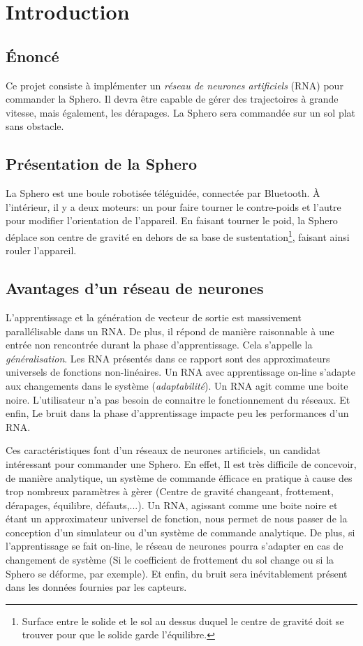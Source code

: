 \section{Introduction}
\subsection{Énoncé}
Ce projet consiste à implémenter un \emph{réseau de neurones artificiels} \hypertarget{rna}{(RNA)} pour commander la Sphero.
Il devra être capable de gérer des trajectoires à grande vitesse, mais également, les dérapages.
La Sphero sera commandée sur un sol plat sans obstacle.
\subsection{Présentation de la Sphero}
La Sphero est une boule robotisée téléguidée, connectée par Bluetooth.
À l'intérieur, il y a deux moteurs: un pour faire tourner le contre-poids et l'autre pour modifier l'orientation de l'appareil.
En faisant tourner le poid, la Sphero déplace son centre de gravité en dehors de sa base de sustentation\footnote{Surface entre le solide et le sol au dessus duquel le centre de gravité doit se trouver pour que le solide garde l'équilibre.}, faisant ainsi rouler l'appareil.
\subsection{Avantages d'un réseau de neurones}

L'apprentissage et la génération de vecteur de sortie est massivement parallélisable dans un RNA.\cite{corelet,Haykin}
De plus, il répond de manière raisonnable à une entrée non rencontrée durant la phase d'apprentissage. Cela s'appelle la \emph{généralisation}.\cite{statistica,Haykin}
Les RNA présentés dans ce rapport sont des approximateurs universels de fonctions non-linéaires.\cite{Haykin}
Un RNA avec apprentissage on-line s'adapte aux changements dans le système (\emph{adaptabilité}).\cite{Haykin}
Un RNA agit comme une boite noire. L'utilisateur n'a pas besoin de connaitre le fonctionnement du réseaux.
Et enfin, Le bruit dans la phase d'apprentissage impacte peu les performances d'un RNA.\cite{Haykin}

Ces caractéristiques font d'un réseaux de neurones artificiels, un candidat intéressant pour commander une Sphero. 
En effet, Il est très difficile de concevoir, de manière analytique, un système de commande éfficace en pratique à cause des trop nombreux paramètres à gèrer (Centre de gravité changeant, frottement, dérapages, équilibre, défauts,...).
Un RNA, agissant comme une boite noire et étant un approximateur universel de fonction, nous permet de nous passer de la conception d'un simulateur ou d'un système de commande analytique.
De plus, si l'apprentissage se fait on-line, le réseau de neurones pourra s'adapter en cas de changement de système (Si le coefficient de frottement du sol change ou si la Sphero se déforme, par exemple).
Et enfin, du bruit sera inévitablement présent dans les données fournies par les capteurs.
